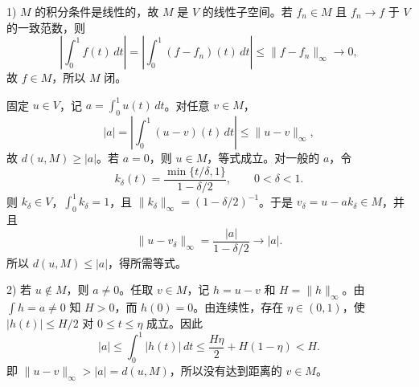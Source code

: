 \documentclass{article}
\begin{document}
1) $M$ 的积分条件是线性的，故 $M$ 是 $V$ 的线性子空间。若 $f_n\in M$ 且 $f_n\to f$ 于 $V$ 的一致范数，则
\[
\left|\int_0^1f(t)\,dt\right|=\left|\int_0^1(f-f_n)(t)\,dt\right|\le\|f-f_n\|_\infty\to0,
\]
故 $f\in M$，所以 $M$ 闭。

固定 $u\in V$，记 $a=\int_0^1u(t)\,dt$。对任意 $v\in M$，
\[
|a|=\left|\int_0^1(u-v)(t)\,dt\right|\le\|u-v\|_\infty,
\]
故 $d(u,M)\ge|a|$。若 $a=0$，则 $u\in M$，等式成立。对一般的 $a$，令
\[
k_\delta(t)=\frac{\min\{t/\delta,1\}}{1-\delta/2},\qquad0<\delta<1.
\]
则 $k_\delta\in V$，$\int_0^1k_\delta=1$，且 $\|k_\delta\|_\infty=(1-\delta/2)^{-1}$。于是 $v_\delta=u-ak_\delta\in M$，并且
\[
\|u-v_\delta\|_\infty=\frac{|a|}{1-\delta/2}\longrightarrow|a|.
\]
所以 $d(u,M)\le|a|$，得所需等式。

2) 若 $u\notin M$，则 $a\ne0$。任取 $v\in M$，记 $h=u-v$ 和 $H=\|h\|_\infty$。由 $\int h=a\ne0$ 知 $H>0$，而 $h(0)=0$。由连续性，存在 $\eta\in(0,1)$，使 $|h(t)|\le H/2$ 对 $0\le t\le\eta$ 成立。因此
\[
|a|\le\int_0^1|h(t)|\,dt\le\frac{H\eta}{2}+H(1-\eta)<H.
\]
即 $\|u-v\|_\infty>|a|=d(u,M)$，所以没有达到距离的 $v\in M$。
\end{document}
